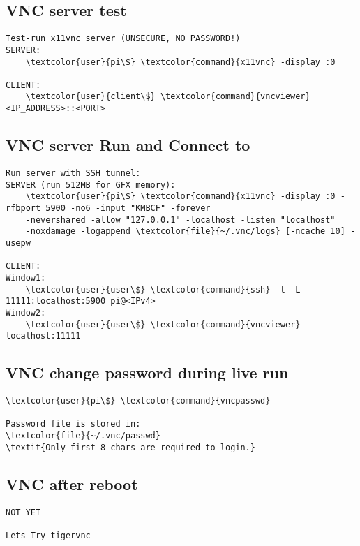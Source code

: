 \documentclass[10pt, a4paper, onecolumn, openany]{book} %
\begin{document}
\subsection{VNC server test}
\begin{Verbatim}[commandchars=\\\{\}]
Test-run x11vnc server (UNSECURE, NO PASSWORD!)
SERVER:
    \textcolor{user}{pi\$} \textcolor{command}{x11vnc} -display :0

CLIENT:
    \textcolor{user}{client\$} \textcolor{command}{vncviewer} <IP_ADDRESS>::<PORT>
\end{Verbatim}

\subsection{VNC server Run and Connect to}
\begin{Verbatim}[commandchars=\\\{\}]
Run server with SSH tunnel:
SERVER (run 512MB for GFX memory):
    \textcolor{user}{pi\$} \textcolor{command}{x11vnc} -display :0 -rfbport 5900 -no6 -input "KMBCF" -forever 
    -nevershared -allow "127.0.0.1" -localhost -listen "localhost" 
    -noxdamage -logappend \textcolor{file}{~/.vnc/logs} [-ncache 10] -usepw

CLIENT:
Window1:
    \textcolor{user}{user\$} \textcolor{command}{ssh} -t -L 11111:localhost:5900 pi@<IPv4>
Window2:
    \textcolor{user}{user\$} \textcolor{command}{vncviewer} localhost:11111
\end{Verbatim}

\subsection{VNC change password during live run}
\begin{Verbatim}[commandchars=\\\{\}]
\textcolor{user}{pi\$} \textcolor{command}{vncpasswd}

Password file is stored in:
\textcolor{file}{~/.vnc/passwd}
\textit{Only first 8 chars are required to login.}
\end{Verbatim}

\subsection{VNC after reboot}
\begin{Verbatim}[commandchars=\\\{\}]
NOT YET

Lets Try tigervnc
\end{Verbatim}
\end{document}

